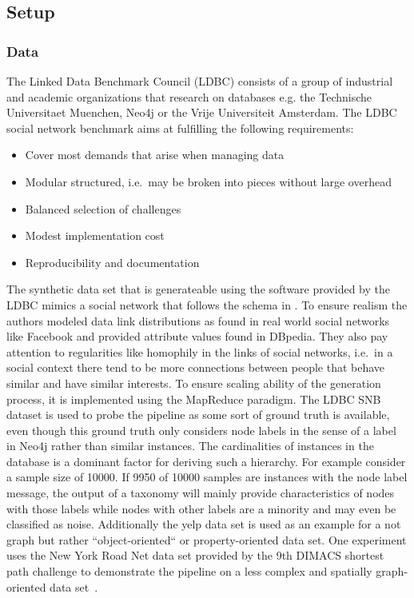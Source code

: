 \subsection{Setup}\label{\positionnumber}
\subsubsection{Data}
The Linked Data Benchmark Council (LDBC) consists of a group of industrial and academic organizations that research on databases e.g. the Technische Universitaet Muenchen, Neo4j or the Vrije Universiteit Amsterdam. The LDBC social network benchmark aims at fulfilling the following requirements:
\begin{itemize}
    \item Cover most demands that arise when managing data
    \item Modular structured, i.e.~may be broken into pieces without large overhead
    \item Balanced selection of challenges
    \item Modest implementation cost
    \item Reproducibility and documentation
\end{itemize}
The synthetic data set that is generateable using the software provided by the LDBC mimics a social network that follows the schema in . To ensure realism the authors modeled data link distributions as found in real world social networks like Facebook and provided attribute values found in DBpedia. They also pay attention to regularities like homophily in the links of social networks, i.e.~in a social context there tend to be more connections between people that behave similar and have similar interests. To ensure scaling ability of the generation process, it is implemented using the MapReduce paradigm.
\noindent The LDBC SNB dataset is used to probe the pipeline as some sort of ground truth is available, even though this ground truth only considers node labels in the sense of a label in Neo4j rather than similar instances. The cardinalities of instances in the database is a dominant factor for deriving such a hierarchy. For example consider a sample size of 10000. If 9950 of 10000 samples are instances with the node label message, the output of a taxonomy will mainly provide characteristics of nodes with those labels while nodes with other labels are a minority and may even be classified as noise.
  Additionally the yelp data set is used as an example for a not graph but rather ``object-oriented`` or property-oriented data set. 
  One experiment uses the New York Road Net data set provided by the 9th DIMACS shortest path challenge to demonstrate the pipeline on a less complex and spatially graph-oriented data set~\cite{9thDIMACSImplementationChallengeShortestPaths-2010-06-14}.
  
